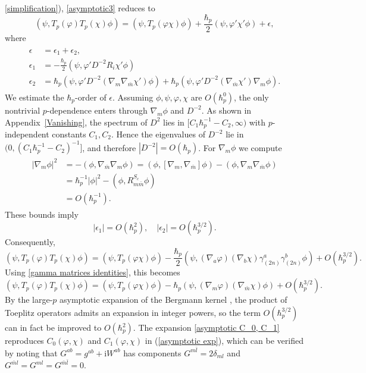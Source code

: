\documentclass[12pt]{article}
\newcommand{\im}{\mathrm{i}}
\newcommand\eq[1]{\begin{equation}#1\end{equation}}
\newcommand\als[1]{\begin{align}\begin{split}#1\end{split}\end{align}}
\theoremstyle{definition} %
\theoremstyle{plain} %
\theoremstyle{remark} %
\theoremstyle{underline}
\begin{document}
\ref{simplification}), \eqref{asymptotic3} reduces to
\eq{
    (\psi,T_p(\varphi) T_p(\chi) \phi) = (\psi,T_p(\varphi \chi) \phi) + \frac{\hbar_p}{2}(\psi, \varphi'\chi' \phi) + \epsilon,
}
where
\als{
    \epsilon &= \epsilon_1 + \epsilon_2,\\
    \epsilon_1 &= - \frac{\hbar_p}{2}(\psi, \varphi' D^{-2} R_i \chi' \phi)\\
    \epsilon_2 &= \hbar_p (\psi, \varphi'D^{-2} (\nabla_m \nabla_{\bar m} \chi') \phi) + \hbar_p (\psi, \varphi'D^{-2} (\nabla_{\bar m} \chi') \nabla_m \phi).
}
We estimate the $\hbar_p$-order of $\epsilon$.
Assuming $\phi,\psi,\varphi,\chi$ are $O(\hbar_p^0)$, the only nontrivial
$p$-dependence enters through $\nabla_m\phi$ and $D^{-2}$.
As shown in Appendix~\ref{Vanishing}, the spectrum of $D^2$ lies in
$[C_1 \hbar_p^{-1}-C_2,\infty)$ with $p$-independent constants $C_1,C_2$.
Hence the eigenvalues of $D^{-2}$ lie in
$(0,(C_1 \hbar_p^{-1}-C_2)^{-1}]$, and therefore $|D^{-2}|=O(\hbar_p)$.
For $\nabla_m\phi$ we compute
\als{
\label{norm order 1}
|\nabla_{m}\phi|^2 &= - (\phi,\nabla_{\bar m}\nabla_{m}\phi)
= (\phi,[\nabla_{m},\nabla_{\bar m}]\phi) - (\phi,\nabla_{m}\nabla_{\bar m}\phi)\\
&= \hbar_p^{-1} |\phi|^2 -  (\phi,R^{S_c}_{m \bar{m}}\phi)  \\
&= O(\hbar_p^{-1}).
}
These bounds imply
\eq{
    |\epsilon_1|= O(\hbar_p^2), \quad  |\epsilon_2| = O(\hbar_p^{3/2}).
}
Consequently,
\eq{
    (\psi,T_p(\varphi)T_p(\chi) \phi) = (\psi,T_p(\varphi \chi) \phi) - \frac{\hbar_p}{2}(\psi, (\nabla_a \varphi)  (\nabla_b \chi) \gamma^a_{(2n)} \gamma^b_{(2n)}\phi) + O(\hbar_p^{3/2}).
}
Using \eqref{gamma matrices identities}, this becomes
\eq{
\label{asymptotic C_0, C_1}
    (\psi,T_p(\varphi)T_p(\chi) \phi) = (\psi,T_p(\varphi \chi) \phi) - \hbar_p(\psi, (\nabla_m \varphi)  (\nabla_{\bar m} \chi) \phi) + O(\hbar_p^{3/2}).
}
By the large-$p$ asymptotic expansion of the Bergmann kernel \cite{asym}, the
product of Toeplitz operators admits an expansion in integer powers, so the term
$O(\hbar_p^{3/2})$ can in fact be improved to $O(\hbar_p^{2})$.
The expansion \eqref{asymptotic C_0, C_1} reproduces $C_0(\varphi,\chi)$ and
$C_1(\varphi,\chi)$ in (\ref{asymptotic exp}), which can be verified by noting
that $G^{ab}=g^{ab}+\im W^{ab}$ has components
$G^{m \bar{l}}=2 \delta_{ml}$ and
$G^{\bar{m}l}=G^{m l}=G^{\bar{m} \bar{l}}=0$.
\end{document}
